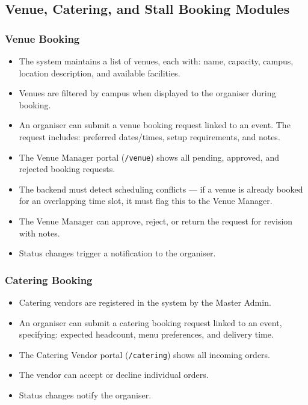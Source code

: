 \documentclass[12pt,a4paper]{article}
\begin{document}
\subsection{Venue, Catering, and Stall Booking Modules}

\subsubsection{Venue Booking}

\begin{itemize}[leftmargin=*]
    \item The system maintains a list of venues, each with: name, capacity, campus, location description, and available facilities.
    \item Venues are filtered by campus when displayed to the organiser during booking.
    \item An organiser can submit a venue booking request linked to an event. The request includes: preferred dates/times, setup requirements, and notes.
    \item The Venue Manager portal (\texttt{/venue}) shows all pending, approved, and rejected booking requests.
    \item The backend must detect scheduling conflicts — if a venue is already booked for an overlapping time slot, it must flag this to the Venue Manager.
    \item The Venue Manager can approve, reject, or return the request for revision with notes.
    \item Status changes trigger a notification to the organiser.
\end{itemize}

\subsubsection{Catering Booking}

\begin{itemize}[leftmargin=*]
    \item Catering vendors are registered in the system by the Master Admin.
    \item An organiser can submit a catering booking request linked to an event, specifying: expected headcount, menu preferences, and delivery time.
    \item The Catering Vendor portal (\texttt{/catering}) shows all incoming orders.
    \item The vendor can accept or decline individual orders.
    \item Status changes notify the organiser.
\end{itemize}
\end{document}
